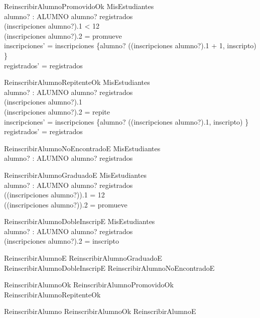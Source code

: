 \begin{schema}{ReinscribirAlumnoPromovidoOk}
    \Delta MisEstudiantes \\
    alumno? : ALUMNO
    \where
    alumno? \in registrados \\
    (inscripciones alumno?).1 < 12 \\ 
    (inscripciones alumno?).2 = promueve \\
    inscripciones' = inscripciones \oplus \{alumno? \mapsto ((inscripciones alumno?).1 + 1, inscripto) \} \\
    registrados' = registrados
\end{schema}

\begin{schema}{ReinscribirAlumnoRepitenteOk}
    \Delta MisEstudiantes \\
    alumno? : ALUMNO
    \where
    alumno? \in registrados \\
    (inscripciones alumno?).1  \\ 
    (inscripciones alumno?).2 = repite \\
    inscripciones' = inscripciones \oplus \{alumno? \mapsto ((inscripciones alumno?).1, inscripto) \} \\
    registrados' = registrados
\end{schema}

\begin{schema}{ReinscribirAlumnoNoEncontradoE}
    \Xi MisEstudiantes \\
    alumno? : ALUMNO
    \where
    alumno? \notin registrados
\end{schema}

\begin{schema}{ReinscribirAlumnoGraduadoE}
    \Xi MisEstudiantes \\
    alumno? : ALUMNO
    \where
    alumno? \in registrados \\
    ((inscripciones alumno?)).1 = 12 \\
    ((inscripciones alumno?)).2 = promueve 
\end{schema}

\begin{schema}{ReinscribirAlumnoDobleInscripE}
    \Xi MisEstudiantes \\
    alumno? : ALUMNO
    \where
    alumno? \in registrados \\
    (inscripciones alumno?).2 = inscripto
\end{schema}

\begin{zed}
    ReinscribirAlumnoE  ReinscribirAlumnoGraduadoE \lor ReinscribirAlumnoDobleInscripE \lor ReinscribirAlumnoNoEncontradoE
\end{zed}
\begin{zed}
    ReinscribirAlumnoOk  ReinscribirAlumnoPromovidoOk \lor ReinscribirAlumnoRepitenteOk
\end{zed}
\begin{zed}
    ReinscribirAlumno  ReinscribirAlumnoOk \lor ReinscribirAlumnoE
\end{zed}

